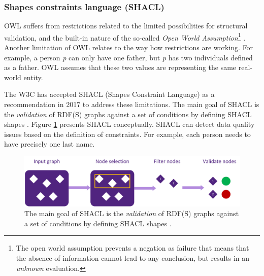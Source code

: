 \subsubsection{Shapes constraints language (SHACL)} \label{tfshacl}
OWL suffers from restrictions related to the limited possibilities for structural validation, and the built-in nature of the so-called \emph{Open World Assumption}\footnote{The open world assumption prevents a negation as failure that means that the absence of information cannot lead to any conclusion, but results in an \emph{unknown} evaluation.} \parencite{SM22}. Another limitation of OWL relates to the way how restrictions are working. For example, a person \emph{p} can only have one father, but \emph{p} has two individuals defined as a father. OWL assumes that these two values are representing the same real-world entity.

The W3C has accepted SHACL (Shapes Constraint Language) as a recommendation in 2017 \parencite{WEB05} to address these limitations. The main goal of SHACL is the \emph{validation} of RDF(S) graphs against a set of conditions by defining SHACL shapes \parencite{WEB05}. Figure \ref{fig:shacl1} presents SHACL conceptually. SHACL can detect data quality issues \parencite{SM23} based on the definition of constraints. For example, each person needs to have precisely one last name.  

\begin{figure}[H]
\centering
  \includegraphics[width=15cm]{../../Images/SHACL1.png}
  \caption{The main goal of SHACL is the \emph{validation} of RDF(S) graphs against a set of conditions by defining SHACL shapes \parencite{WEB05}.}
  \label{fig:shacl1}
\end{figure}

